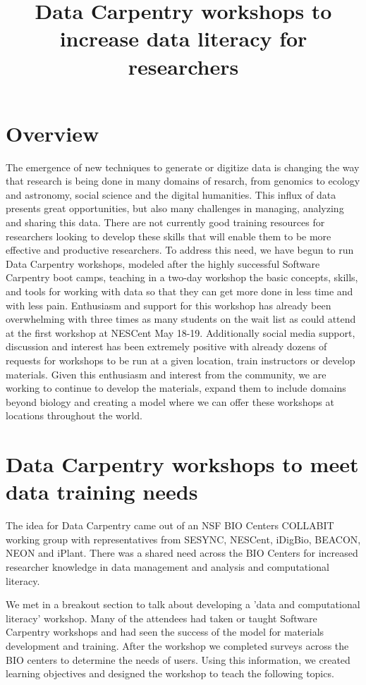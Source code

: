 \documentclass[11pt]{article}
\begin{document}
\title{Data Carpentry workshops to increase data literacy for researchers}
\maketitle

\section{Overview }
The emergence of new techniques to generate or digitize data is changing the way that research is being done in many domains of resarch, from genomics to ecology and astronomy, social science and the digital humanities. This influx of data presents great opportunities, but also many challenges in managing, analyzing and sharing this data. There are not currently good training resources for researchers looking to develop these skills that will enable them to be more effective and productive researchers. To address this need, we have begun to run Data Carpentry workshops, modeled after the highly successful Software Carpentry boot camps, teaching in a  two-day workshop the basic concepts, skills, and tools for working with data so that they can get more done in less time and with less pain. Enthusiasm and support for this workshop has already been overwhelming with three times as many students on the wait list as could attend at the first workshop at NESCent May 18-19. Additionally social media support, discussion and interest has been extremely positive with already dozens of requests for workshops to be run at a given location, train instructors or develop materials. Given this enthusiasm and interest from the community, we are working to continue to develop the materials, expand them to include domains beyond biology and creating a model where we can offer these workshops at locations throughout the world.


\section{Data Carpentry workshops to meet data training needs}

The idea for Data Carpentry came out of an NSF BIO Centers COLLABIT working group with 
representatives from SESYNC, NESCent, iDigBio, BEACON, NEON and iPlant. There was a shared 
need across the BIO Centers for increased researcher knowledge in data management and 
analysis and computational literacy. 

We met in a breakout section to talk about developing a 'data and computational literacy'
workshop. Many of the attendees had taken or taught Software Carpentry workshops and
had seen the success of the model for materials development and training. After the workshop we completed 
surveys across the BIO centers to determine the needs of users. Using this information, we created learning objectives and designed the workshop to teach the following topics.
\end{document}
